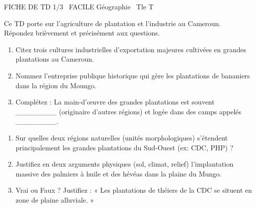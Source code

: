 \documentclass[11pt]{article}
\begin{document}
\begin{tcolorbox}[enhanced,colback=popink,colframe=popink,arc=10pt,boxrule=0pt,left=12pt,right=12pt,top=9pt,bottom=9pt]
{\color{white}\popxbold\small FICHE DE TD 1/3 \textbullet\ FACILE \hfill Géographie \textbullet\ Tle T\par}
\end{tcolorbox}
\vspace{4pt}
Ce TD porte sur l'agriculture de plantation et l'industrie au Cameroun. Répondez brièvement et précisément aux questions.

\begin{exercice}
\begin{enumerate}
    \item Citez trois cultures industrielles d'exportation majeures cultivées en grandes plantations au Cameroun.
    \item Nommez l'entreprise publique historique qui gère les plantations de bananiers dans la région du Moungo.
    \item Complétez : La main-d'œuvre des grandes plantations est souvent \textit{\_\_\_\_\_\_\_\_} (originaire d'autres régions) et logée dans des camps appelés \textit{\_\_\_\_\_\_\_\_}.
\end{enumerate}
\end{exercice}

\begin{exercice}
\begin{enumerate}
    \item Sur quelles deux régions naturelles (unités morphologiques) s'étendent principalement les grandes plantations du Sud-Ouest (ex: CDC, PHP) ?
    \item Justifiez en deux arguments physiques (sol, climat, relief) l'implantation massive des palmiers à huile et des hévéas dans la plaine du Mungo.
    \item Vrai ou Faux ? Justifiez : « Les plantations de théiers de la CDC se situent en zone de plaine alluviale. »
\end{enumerate}
\end{exercice}
\end{document}
